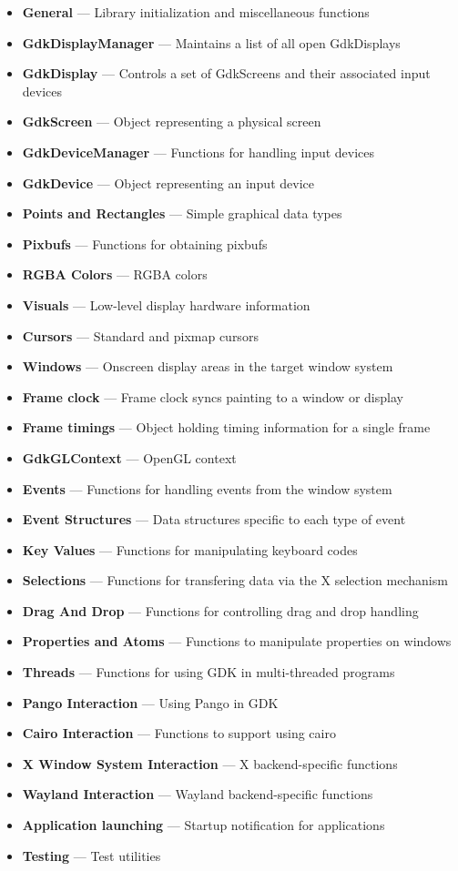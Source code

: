 \documentclass[12pt]{article}
\begin{document}
\begin{itemize}
\begin{enumerate}[I]
\begin{itemize}
\item \textbf{General} — Library initialization and miscellaneous functions
\item \textbf{GdkDisplayManager} — Maintains a list of all open GdkDisplays
\item \textbf{GdkDisplay} — Controls a set of GdkScreens and their associated input devices
\item \textbf{GdkScreen} — Object representing a physical screen
\item \textbf{GdkDeviceManager} — Functions for handling input devices
\item \textbf{GdkDevice} — Object representing an input device
\item \textbf{Points and Rectangles} — Simple graphical data types
\item \textbf{Pixbufs} — Functions for obtaining pixbufs
\item \textbf{RGBA Colors} — RGBA colors
\item \textbf{Visuals} — Low-level display hardware information
\item \textbf{Cursors} — Standard and pixmap cursors
\item \textbf{Windows} — Onscreen display areas in the target window system
\item \textbf{Frame clock} — Frame clock syncs painting to a window or display
\item \textbf{Frame timings} — Object holding timing information for a single frame
\item \textbf{GdkGLContext} — OpenGL context
\item \textbf{Events} — Functions for handling events from the window system
\item \textbf{Event Structures} — Data structures specific to each type of event
\item \textbf{Key Values} — Functions for manipulating keyboard codes
\item \textbf{Selections} — Functions for transfering data via the X selection mechanism
\item \textbf{Drag And Drop} — Functions for controlling drag and drop handling
\item \textbf{Properties and Atoms} — Functions to manipulate properties on windows
\item \textbf{Threads} — Functions for using GDK in multi-threaded programs
\item \textbf{Pango Interaction} — Using Pango in GDK
\item \textbf{Cairo Interaction} — Functions to support using cairo
\item \textbf{X Window System Interaction} — X backend-specific functions
\item \textbf{Wayland Interaction} — Wayland backend-specific functions
\item \textbf{Application launching} — Startup notification for applications
\item \textbf{Testing} — Test utilities




\end{itemize}
\end{enumerate}
\end{itemize}
\end{document}
